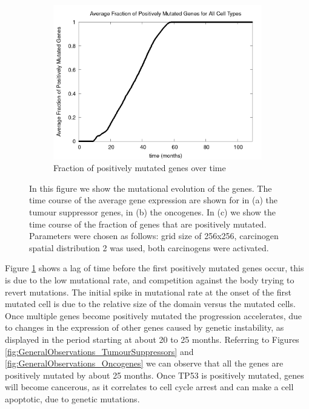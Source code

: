 \documentclass[\main/thesis.tex]{subfiles}
\begin{document}
\begin{figure}
    \begin{subfigure}[t]{.55\textwidth}
      \centering
      \includegraphics[width=\textwidth]{images/2_GeneralObservations/Fig2/numPosMut_all.png}
      \caption{Fraction of positively mutated genes over time}
      \label{fig:GeneralObservations_numPosMut}
    \end{subfigure}
    \caption{In this figure we show the mutational evolution of the genes. The time course of the average gene expression are shown for in (a) the tumour suppressor genes, in (b) the oncogenes. In (c) we show the time course of the fraction of genes that are positively mutated. Parameters were chosen as follows: grid size of 256x256, carcinogen spatial distribution 2 was used, both carcinogens were activated.}
    \label{fig:GeneralObservations_GeneEvo}
\end{figure}

Figure \ref{fig:GeneralObservations_numPosMut} shows a lag of time before the first positively mutated genes occur, this is due to the low mutational rate, and competition against the body trying to revert mutations. The initial spike in mutational rate at the onset of the first mutated cell is due to the relative size of the domain versus the mutated cells. Once multiple genes become positively mutated the progression accelerates, due to changes in the expression of other genes caused by genetic instability, as displayed in the period starting at about 20 to 25 months. Referring to Figures \ref{fig:GeneralObservations_TumourSuppressors} and \ref{fig:GeneralObservations_Oncogenes} we can observe that all the genes are positively mutated by about 25 months. Once TP53 is positively mutated, genes will become cancerous, as it correlates to cell cycle arrest and can make a cell apoptotic, due to genetic mutations.
\end{document}
